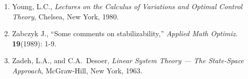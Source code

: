 \begin{enumerate}
\item
Young, L.C., {\it Lectures on the Calculus of Variations and Optimal Control
Theory}, Chelsea, New York, 1980.

\item
Zabczyk J., ``Some comments on stabilizability,'' {\it Applied Math Optimiz.}
{\bf 19}(1989): 1-9.

\item
Zadeh, L.A., and C.A.\ Desoer, {\it Linear System Theory --- The State-Space
Approach}, McGraw-Hill, New York, 1963.

\end{enumerate}

